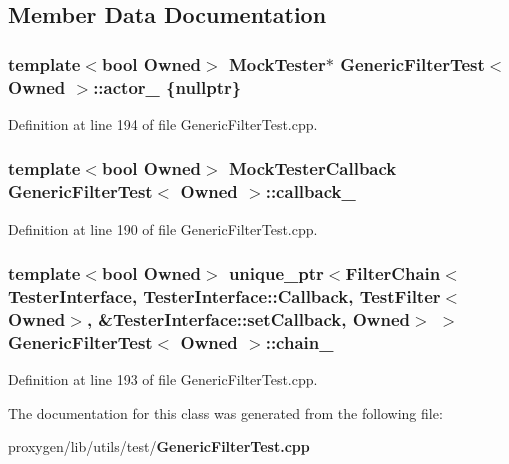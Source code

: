 \subsection{Member Data Documentation}
\subsubsection[{actor\+\_\+}]{\setlength{\rightskip}{0pt plus 5cm}template$<$bool Owned$>$ {\bf Mock\+Tester}$\ast$ {\bf Generic\+Filter\+Test}$<$ Owned $>$\+::actor\+\_\+ \{{\bf nullptr}\}}\label{classGenericFilterTest_a01122058f0740a991c09fd6ce97e2c74}


Definition at line 194 of file Generic\+Filter\+Test.\+cpp.

\subsubsection[{callback\+\_\+}]{\setlength{\rightskip}{0pt plus 5cm}template$<$bool Owned$>$ {\bf Mock\+Tester\+Callback} {\bf Generic\+Filter\+Test}$<$ Owned $>$\+::callback\+\_\+}\label{classGenericFilterTest_afad6f89b1cea3888dd3762d83b8267fd}


Definition at line 190 of file Generic\+Filter\+Test.\+cpp.

\subsubsection[{chain\+\_\+}]{\setlength{\rightskip}{0pt plus 5cm}template$<$bool Owned$>$ unique\+\_\+ptr$<${\bf Filter\+Chain}$<${\bf Tester\+Interface}, {\bf Tester\+Interface\+::\+Callback}, {\bf Test\+Filter}$<$Owned$>$, \&{\bf Tester\+Interface\+::set\+Callback}, Owned$>$ $>$ {\bf Generic\+Filter\+Test}$<$ Owned $>$\+::chain\+\_\+}\label{classGenericFilterTest_a27a1ccc0948037590f14d8b61f1a759f}


Definition at line 193 of file Generic\+Filter\+Test.\+cpp.



The documentation for this class was generated from the following file\+:\begin{DoxyCompactItemize}
\item 
proxygen/lib/utils/test/{\bf Generic\+Filter\+Test.\+cpp}\end{DoxyCompactItemize}
